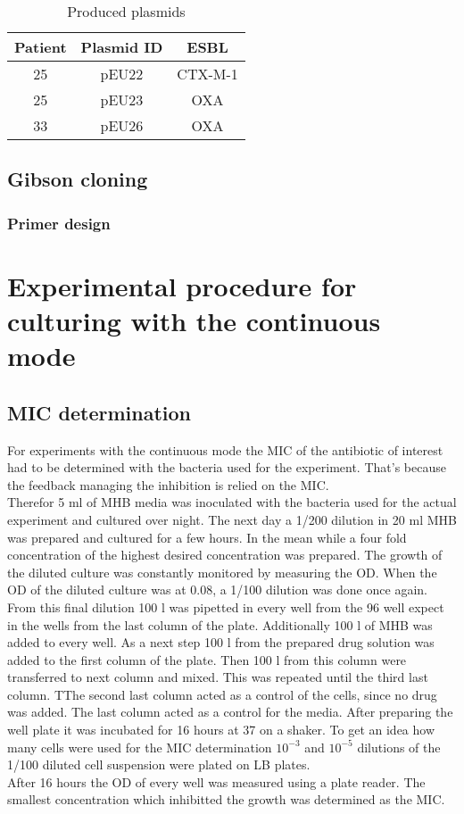 \begin{table}[H]
	\begin{tabular}{|c c c|}	
		\hline
		Patient & Plasmid ID & ESBL \\
		\hline
		25 & pEU22 & CTX-M-1 \\
		\hline
		25 & pEU23 & OXA \\
		\hline
		33 & pEU26 & OXA \\
		\hline
	\end{tabular}
	\label{table:plasmid}
	\caption{Produced plasmids}
\end{table}
\subsection{Gibson cloning}
\label{section:plasmid}
\subsubsection{Primer design}

\section{Experimental procedure for culturing with the continuous mode}
\subsection{MIC determination}
For experiments with the continuous mode the MIC of the antibiotic of interest had to be determined with the bacteria used for the experiment. That's because the feedback managing the inhibition is relied on the MIC. \\
Therefor 5 ml of MHB media was inoculated with the bacteria used for the actual experiment and cultured over night. The next day a 1/200 dilution in 20 ml MHB was prepared and cultured for a few hours. In the mean while a four fold concentration of the highest desired concentration was prepared. The growth of the diluted culture was constantly monitored by measuring the OD. When the OD of the diluted culture was at 0.08, a 1/100 dilution was done once again. From this final dilution 100 \textmu l was pipetted in every well from the 96 well expect in the wells from the last column of the plate. Additionally 100 \textmu l of MHB was added to every well. As a next step 100 \textmu l from the prepared drug solution was added to the first column of the plate. Then 100 \textmu l from this column were transferred to next column and mixed. This was repeated until the third last column. TThe second last column acted as a control of the cells, since no drug was added. The last column acted as a control for the media. After preparing the well plate it was incubated for 16 hours at 37 \degree \space on a shaker. To get an idea how many cells were used for the MIC determination $10^{-3}$ and $10^{-5}$ dilutions of the 1/100 diluted cell suspension were plated on LB plates.\\
After 16 hours the OD of every well was measured using a plate reader. The smallest concentration which inhibitted the growth was determined as the MIC. 
\label{section:mic_determination}


